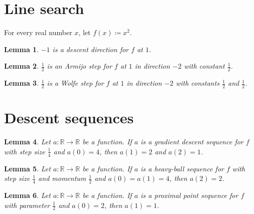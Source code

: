 \documentclass{article}
\newtheorem{lemma}{Lemma}
\begin{document}
\section{Line search}

For every real number $x$, let $f(x)\coloneqq x^2$.

\begin{lemma}\label{direction}
$-1$ is a descent direction for $f$ at $1$.
\end{lemma}

\begin{lemma}\label{armijo}
$\frac12$ is an Armijo step for $f$ at $1$ in direction $-2$ with constant $\frac12$.
\end{lemma}

\begin{lemma}\label{wolfe}
$\frac12$ is a Wolfe step for $f$ at $1$ in direction $-2$ with constants $\frac12$ and $\frac12$.
\end{lemma}

\section{Descent sequences}

\begin{lemma}\label{gradient}
Let $a:\mathbb{R}\to\mathbb{R}$ be a function. If $a$ is a gradient descent sequence for $f$ with step size $\frac14$ and $a(0)=4$, then $a(1)=2$ and $a(2)=1$.
\end{lemma}

\begin{lemma}\label{heavyball}
Let $a:\mathbb{R}\to\mathbb{R}$ be a function. If $a$ is a heavy-ball sequence for $f$ with step size $\frac14$ and momentum $\frac12$ and $a(0)=a(1)=4$, then $a(2)=2$.
\end{lemma}

\begin{lemma}\label{proximal}
Let $a:\mathbb{R}\to\mathbb{R}$ be a function. If $a$ is a proximal point sequence for $f$ with parameter $\frac12$ and $a(0)=2$, then $a(1)=1$.
\end{lemma}
\end{document}
